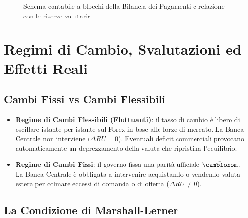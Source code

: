 \begin{figure}[htbp]
\caption{Schema contabile a blocchi della Bilancia dei Pagamenti e relazione con le riserve valutarie.}
\label{fig:schema_bilancia_pagamenti}
\end{figure}

\section{Regimi di Cambio, Svalutazioni ed Effetti Reali}

\subsection{Cambi Fissi vs Cambi Flessibili}
\begin{itemize}
    \item \textbf{Regime di Cambi Flessibili (Fluttuanti)}: il tasso di cambio è libero di oscillare istante per istante sul Forex in base alle forze di mercato. La Banca Centrale non interviene ($\Delta RU = 0$). Eventuali deficit commerciali provocano automaticamente un deprezzamento della valuta che ripristina l'equilibrio.
    \item \textbf{Regime di Cambi Fissi}: il governo fissa una parità ufficiale $\bar{\cambionom}$. La Banca Centrale è obbligata a intervenire acquistando o vendendo valuta estera per colmare eccessi di domanda o di offerta ($\Delta RU \neq 0$).
\end{itemize}

\subsection{La Condizione di Marshall-Lerner}

